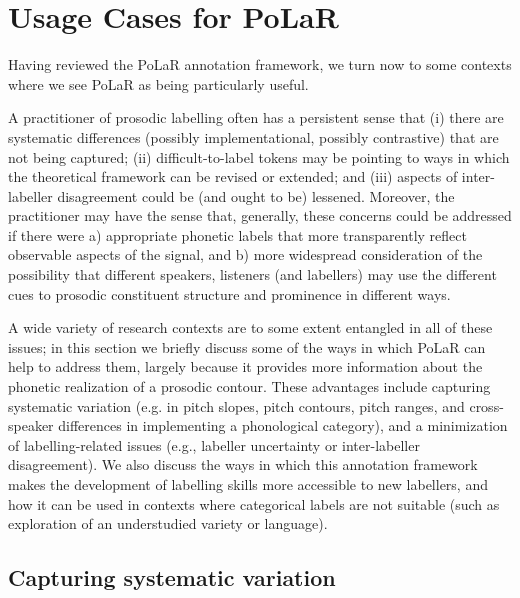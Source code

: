 \chapter{Usage Cases for PoLaR}\label{ch:advantages}

Having reviewed the PoLaR annotation framework, we turn now to some contexts where we see PoLaR as being particularly useful.

A practitioner of prosodic labelling often has a persistent sense that (i) there are systematic differences (possibly implementational, possibly contrastive) that are not being captured; (ii) difficult-to-label tokens may be pointing to ways in which the theoretical framework can be revised or extended; and (iii) aspects of inter-labeller disagreement could be (and ought to be) lessened. Moreover, the practitioner may have the sense that, generally, these concerns could be addressed if there were a) appropriate phonetic labels that more transparently reflect observable aspects of the signal, and b) more widespread consideration of the possibility that different speakers, listeners (and labellers) may use the different cues to prosodic constituent structure and prominence in different ways.

A wide variety of research contexts are to some extent entangled in all of these issues; in this section we briefly discuss some of the ways in which PoLaR can help to address them, largely because it provides more information about the phonetic realization of a prosodic contour. These advantages include capturing systematic variation (e.g. in pitch slopes, pitch contours, pitch ranges, and cross-speaker differences in implementing a phonological category), and a minimization of labelling-related issues (e.g., labeller uncertainty or inter-labeller disagreement). We also discuss the ways in which this annotation framework makes the development of labelling skills more accessible to new labellers, and how it can be used in contexts where categorical labels are not suitable (such as exploration of an understudied variety or language). 


\section{Capturing systematic variation}\label{sec:capturing-systematic-variation}

